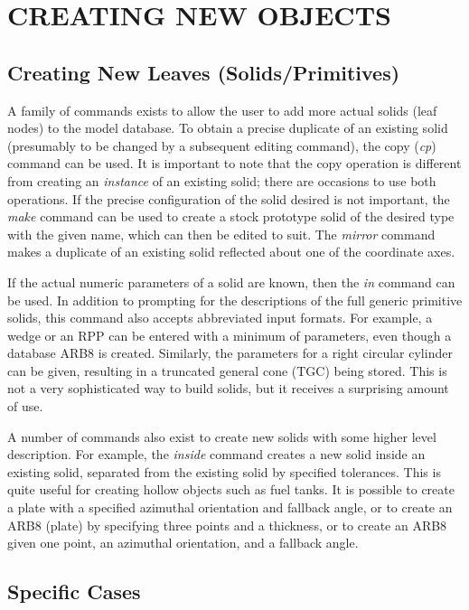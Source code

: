 \chapter{CREATING NEW OBJECTS}

\section{Creating New Leaves (Solids/Primitives)}

A family of commands exists to allow the user to
add more actual solids (leaf nodes) to the model database.
To obtain a precise duplicate of an existing solid (presumably to be
changed by a subsequent editing command), the copy ({\em cp}) command
can be used.  It is important to note that the copy operation is
different from creating an {\em instance} of an existing solid;
there are occasions to use both operations.
If the precise configuration of the solid desired is not important, the
{\em make} command can be used to create a stock prototype solid of the
desired type with the given name, which can then be edited to suit.
The {\em mirror} command makes a
duplicate of an existing solid reflected about
one of the coordinate axes.

If the actual numeric parameters of a solid are known, then the {\em in}
command can be used.  In addition to prompting for the descriptions of
the full generic primitive solids, this command also accepts
abbreviated input formats.  For example, a wedge or an RPP can be entered
with a minimum of parameters, even though a database ARB8 is created.
Similarly, the parameters for a right circular cylinder can be given,
resulting in a truncated general cone (TGC) being stored.
This is not a very sophisticated way to build solids, but it receives
a surprising amount of use.

A number of commands also exist to create new solids with some
higher level description.  For example, the {\em inside} command
creates a new solid inside an existing solid, separated from the
existing solid by specified tolerances.  This is quite useful for
creating hollow objects such as fuel tanks.
It is possible to create a plate with a specified
azimuthal orientation and fallback angle, or to create an ARB8 (plate)
by specifying three points and a thickness, or to create an ARB8
given one point, an azimuthal orientation, and a fallback angle.

\section{Specific Cases}

